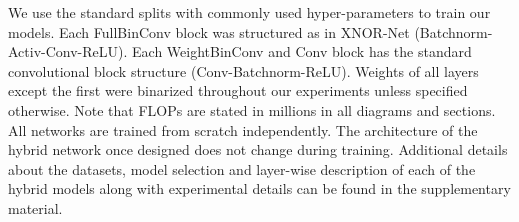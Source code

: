 \documentclass[10pt,twocolumn,letterpaper]{article}
\begin{document}
We use the standard splits with commonly used hyper-parameters to train our models. Each FullBinConv block was structured as in XNOR-Net (Batchnorm-Activ-Conv-ReLU). Each WeightBinConv and Conv block has the standard convolutional block structure (Conv-Batchnorm-ReLU). Weights of all layers except the first were binarized throughout our experiments unless specified otherwise. Note that FLOPs are stated in millions in all diagrams and sections. All networks are trained from scratch independently. The architecture of the hybrid network once designed does not change during training. Additional details about the datasets, model selection and layer-wise description of each of the hybrid models along with experimental details can be found in the supplementary material. 

\end{document}
